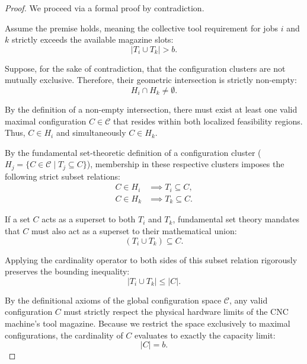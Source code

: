 \documentclass[11pt, a4paper]{book}
\begin{document}
	\begin{proof}
		We proceed via a formal proof by contradiction. 
		
		Assume the premise holds, meaning the collective tool requirement for jobs $i$ and $k$ strictly exceeds the available magazine slots:
		\begin{equation}
			|T_i \cup T_k| > b. \label{eq:disjoint_premise}
		\end{equation}
		
		Suppose, for the sake of contradiction, that the configuration clusters are not mutually exclusive. Therefore, their geometric intersection is strictly non-empty:
		\begin{equation}
			H_i \cap H_k \neq \emptyset.
		\end{equation}
		
		By the definition of a non-empty intersection, there must exist at least one valid maximal configuration $C \in \mathcal{C}$ that resides within both localized feasibility regions. Thus, $C \in H_i$ and simultaneously $C \in H_k$. 
		
		By the fundamental set-theoretic definition of a configuration cluster ($H_j = \{C \in \mathcal{C} \mid T_j \subseteq C\}$), membership in these respective clusters imposes the following strict subset relations:
		\begin{align}
			C \in H_i & \implies T_i \subseteq C, \\
			C \in H_k & \implies T_k \subseteq C.
		\end{align}
		
		If a set $C$ acts as a superset to both $T_i$ and $T_k$, fundamental set theory mandates that $C$ must also act as a superset to their mathematical union:
		\begin{equation}
			(T_i \cup T_k) \subseteq C.
		\end{equation}
		
		Applying the cardinality operator to both sides of this subset relation rigorously preserves the bounding inequality:
		\begin{equation}
			|T_i \cup T_k| \le |C|. \label{eq:disjoint_cardinality}
		\end{equation}
		
		By the definitional axioms of the global configuration space $\mathcal{C}$, any valid configuration $C$ must strictly respect the physical hardware limits of the CNC machine's tool magazine. Because we restrict the space exclusively to maximal configurations, the cardinality of $C$ evaluates to exactly the capacity limit:
		\begin{equation}
			|C| = b. \label{eq:disjoint_capacity}
		\end{equation}
		

\end{proof}
\end{document}
